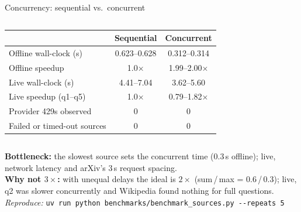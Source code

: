\documentclass[aspectratio=169,11pt]{beamer}
\begin{document}
\begin{frame}{Concurrency: sequential vs.\ concurrent}

  \vspace{0.3em}
  \begin{columns}[T,onlytextwidth]
  \footnotesize
  \begin{tabularx}{\linewidth}{@{}Xcc@{}}
    \toprule
    & \textbf{Sequential} & \textbf{Concurrent} \\
    \midrule
    Offline wall-clock (s)      & 0.623--0.628 & 0.312--0.314 \\
    Offline speedup             & 1.0$\times$  & 1.99--2.00$\times$ \\
    Live wall-clock (s)         & 4.41--7.04   & 3.62--5.60 \\
    Live speedup (q1--q5)       & 1.0$\times$  & 0.79--1.82$\times$ \\
    Provider 429s observed      & 0 & 0 \\
    Failed or timed-out sources & 0 & 0 \\
    \bottomrule
  \end{tabularx}

  \end{columns}

  \vspace{0.3em}
  {\footnotesize\textbf{Bottleneck:} the slowest source sets the concurrent time (0.3\,s offline);
  live, network latency and arXiv's 3\,s request spacing.\\[2pt]
  \textbf{Why not $3\times$:} with unequal delays the ideal is $2\times$
  (sum\,/\,max = 0.6\,/\,0.3); live, q2 was slower concurrently and Wikipedia found nothing for
  full questions.\\[2pt]
  \textit{Reproduce:} \texttt{uv run python benchmarks/benchmark\_sources.py -{}-repeats 5}}
\end{frame}
\end{document}
